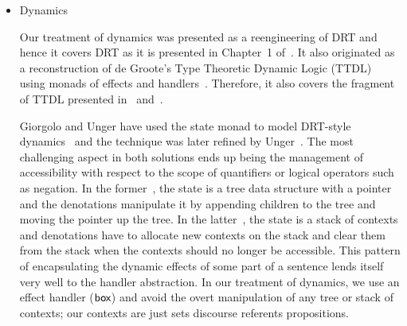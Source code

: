 \begin{itemize}
  We use deixis as the first example in
  Chapter~\ref{chap:introducing-effects}. Wanting to give an example of a
  handler for $\op{speaker}$ that appears within a lexical entry, we turned
  to direct quotations. However, the meanings that we give to sentences
  such as Example~\ref{ex:mary-peter} only express part of the
  meaning. Namely, we capture the fact Peter claims that Mary kissed
  him. Nevertheless, the sentence also entails that Peter uttered the
  sentence ``Mary kissed me''. Therefore, in our analysis, the sentence in
  Example~\ref{ex:mary-peter} would be judged equivalent to the sentence in
  Example~\ref{ex:peter-mary}. The meaning of direct quotation does not
  depend only on the meaning of the quoted clause, but on its exact
  form. Since our system is strictly compositional,\footnote{We are using
    abstract categorial grammars for the syntax-semantics interface.} we
  would need to make it so that the meaning of every sentence is the
  sentence itself. More elaborate treatments of quotation can be found
  in~\cite{geurts2003quotation,potts2007dimensions,shan2010character}.

  \begin{exe}
    \ex Peter said ``Mary kissed me''. \label{ex:mary-peter}
    \ex Peter said ``I was kissed by Mary''. \label{ex:peter-mary}
  \end{exe}

  
\item Dynamics

  Our treatment of dynamics was presented as a reengineering of DRT and
  hence it covers DRT as it is presented in Chapter~1
  of~\cite{kamp1993discourse}. It also originated as a reconstruction of de
  Groote's Type Theoretic Dynamic Logic (TTDL)~\cite{de2006towards} using
  monads of effects and handlers~\cite{marsik2014algebraic}. Therefore, it
  also covers the fragment of TTDL presented in~\cite{de2006towards}
  and~\cite{lebedeva2012expression}.

  Giorgolo and Unger have used the state monad to model DRT-style
  dynamics~\cite{giorgolo2009coreference} and the technique was later
  refined by Unger~\cite{unger2012dynamic}. The most challenging aspect in
  both solutions ends up being the management of accessibility with respect
  to the scope of quantifiers or logical operators such as negation. In the
  former~\cite{giorgolo2009coreference}, the state is a tree data structure
  with a pointer and the denotations manipulate it by appending children to
  the tree and moving the pointer up the tree. In the
  latter~\cite{unger2012dynamic}, the state is a stack of contexts and
  denotations have to allocate new contexts on the stack and clear them
  from the stack when the contexts should no longer be accessible. This
  pattern of encapsulating the dynamic effects of some part of a sentence
  lends itself very well to the handler abstraction. In our treatment of
  dynamics, we use an effect handler ($\textsf{box}$) and avoid the overt
  manipulation of any tree or stack of contexts; our contexts are just sets
  discourse referents propositions.



\end{itemize}
